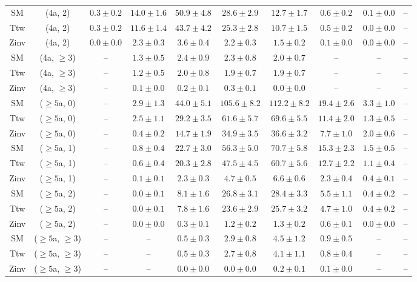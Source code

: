 \begin{table}[h!]
{\begin{tabular}{cccccccccc}
	SM & (4a, 2) & $0.3\pm 0.2$ & $14.0\pm 1.6$ & $50.9\pm 4.8$ & $28.6\pm 2.9$ & $12.7\pm 1.7$ & $0.6\pm 0.2$ & $0.1\pm 0.0$ & -- \\[0.5ex] 
	Ttw & (4a, 2) & $0.3\pm 0.2$ & $11.6\pm 1.4$ & $43.7\pm 4.2$ & $25.3\pm 2.8$ & $10.7\pm 1.5$ & $0.5\pm 0.2$ & $0.0\pm 0.0$ & -- \\[0.5ex] 
	Zinv & (4a, 2) & $0.0\pm 0.0$ & $2.3\pm 0.3$ & $3.6\pm 0.4$ & $2.2\pm 0.3$ & $1.5\pm 0.2$ & $0.1\pm 0.0$ & $0.0\pm 0.0$ & -- \\[0.5ex] 
	SM & (4a, $\ge3$) & -- & $1.3\pm 0.5$ & $2.4\pm 0.9$ & $2.3\pm 0.8$ & $2.0\pm 0.7$ & -- & -- & -- \\[0.5ex] 
	Ttw & (4a, $\ge3$) & -- & $1.2\pm 0.5$ & $2.0\pm 0.8$ & $1.9\pm 0.7$ & $1.9\pm 0.7$ & -- & -- & -- \\[0.5ex] 
	Zinv & (4a, $\ge3$) & -- & $0.1\pm 0.0$ & $0.2\pm 0.1$ & $0.3\pm 0.1$ & $0.0\pm 0.0$ & -- & -- & -- \\[0.5ex] 
	SM & ($\ge5$a, 0) & -- & $2.9\pm 1.3$ & $44.0\pm 5.1$ & $105.6\pm 8.2$ & $112.2\pm 8.2$ & $19.4\pm 2.6$ & $3.3\pm 1.0$ & -- \\[0.5ex] 
	Ttw & ($\ge5$a, 0) & -- & $2.5\pm 1.1$ & $29.2\pm 3.5$ & $61.6\pm 5.7$ & $69.6\pm 5.5$ & $11.4\pm 2.0$ & $1.3\pm 0.5$ & -- \\[0.5ex] 
	Zinv & ($\ge5$a, 0) & -- & $0.4\pm 0.2$ & $14.7\pm 1.9$ & $34.9\pm 3.5$ & $36.6\pm 3.2$ & $7.7\pm 1.0$ & $2.0\pm 0.6$ & -- \\[0.5ex] 
	SM & ($\ge5$a, 1) & -- & $0.8\pm 0.4$ & $22.7\pm 3.0$ & $56.3\pm 5.0$ & $70.7\pm 5.8$ & $15.3\pm 2.3$ & $1.5\pm 0.5$ & -- \\[0.5ex] 
	Ttw & ($\ge5$a, 1) & -- & $0.6\pm 0.4$ & $20.3\pm 2.8$ & $47.5\pm 4.5$ & $60.7\pm 5.6$ & $12.7\pm 2.2$ & $1.1\pm 0.4$ & -- \\[0.5ex] 
	Zinv & ($\ge5$a, 1) & -- & $0.1\pm 0.1$ & $2.3\pm 0.3$ & $4.7\pm 0.5$ & $6.6\pm 0.6$ & $2.3\pm 0.4$ & $0.4\pm 0.1$ & -- \\[0.5ex] 
	SM & ($\ge5$a, 2) & -- & $0.0\pm 0.1$ & $8.1\pm 1.6$ & $26.8\pm 3.1$ & $28.4\pm 3.3$ & $5.5\pm 1.1$ & $0.4\pm 0.2$ & -- \\[0.5ex] 
	Ttw & ($\ge5$a, 2) & -- & $0.0\pm 0.1$ & $7.8\pm 1.6$ & $23.6\pm 2.9$ & $25.7\pm 3.2$ & $4.7\pm 1.0$ & $0.4\pm 0.2$ & -- \\[0.5ex] 
	Zinv & ($\ge5$a, 2) & -- & $0.0\pm 0.0$ & $0.3\pm 0.1$ & $1.2\pm 0.2$ & $1.3\pm 0.2$ & $0.6\pm 0.1$ & $0.0\pm 0.0$ & -- \\[0.5ex] 
	SM & ($\ge5$a, $\ge3$) & -- & -- & $0.5\pm 0.3$ & $2.9\pm 0.8$ & $4.5\pm 1.2$ & $0.9\pm 0.5$ & -- & -- \\[0.5ex] 
	Ttw & ($\ge5$a, $\ge3$) & -- & -- & $0.5\pm 0.3$ & $2.7\pm 0.8$ & $4.1\pm 1.1$ & $0.8\pm 0.4$ & -- & -- \\[0.5ex] 
	Zinv & ($\ge5$a, $\ge3$) & -- & -- & $0.0\pm 0.0$ & $0.0\pm 0.0$ & $0.2\pm 0.1$ & $0.1\pm 0.0$ & -- & -- \\[0.5ex] 
	\hline
	\hline
\end{tabular}}
\end{table}
